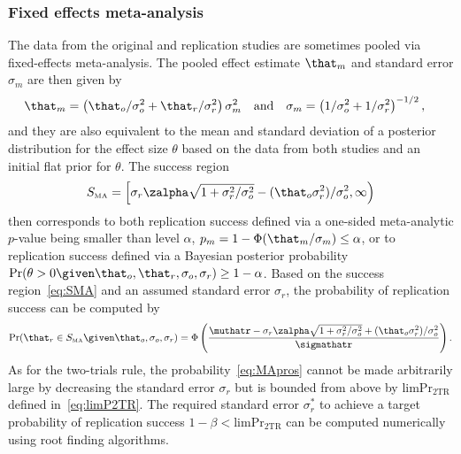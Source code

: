 \subsubsection{Fixed effects meta-analysis}
The data from the original and replication studies are sometimes pooled via
fixed-effects meta-analysis. The pooled effect estimate $\that_{m}$ and standard
error $\sigma_{m}$ are then given by
\begin{align*}
  &\that_{m} =
    \left(\that_{o}/\sigma_{o}^{2} + \that_{r}/\sigma^{2}_{r}\right)\sigma^{2}_{m}&
&\text{and}&                                                                                       &\sigma_{m} = \left(1/\sigma^{2}_{o} + 1/\sigma^{2}_{r}\right)^{-1/2},&
\end{align*}
and they are also equivalent to the mean and standard deviation of a posterior
distribution for the effect size $\theta$ based on the data from both studies
and an initial flat prior for $\theta$. The success
region %
\begin{align}
  \label{eq:SMA}
  S_{\scriptscriptstyle \text{MA}}
  = \left[\sigma_{r} \zalpha\sqrt{1 + \sigma^{2}_{r}/\sigma^{2}_{o}} -
  (\that_{o} \sigma^{2}_{r})/\sigma^{2}_{o},
  \infty \right)
\end{align}
then corresponds to both replication success defined via a one-sided
meta-analytic $p$-value being smaller than level $\alpha$, \ie{}
$p_{m} = 1 - \Phi(\that_{m}/\sigma_{m}) \leq \alpha$, or to replication success
defined via a Bayesian posterior probability
$\Pr(\theta > 0 \given \that_{o}, \that_{r}, \sigma_{o}, \sigma_{r}) \geq 1 - \alpha$.
Based on the success region~\eqref{eq:SMA} and an assumed standard error
$\sigma_{r}$, the probability of replication success can be computed by
\begin{align}
  \label{eq:MApros}
  \Pr(\that_{r} \in S_{\scriptscriptstyle \text{MA}} \given \that_{o}, \sigma_{o}, \sigma_{r})
  = %
  \Phi\left(\frac{\muthatr - \sigma_{r} \zalpha\sqrt{1 + \sigma^{2}_{r}/\sigma^{2}_{o}}
  + (\that_{o} \sigma^{2}_{r})/\sigma^{2}_{o}}{\sigmathatr}\right).
\end{align}
As for the two-trials rule, the probability~\eqref{eq:MApros} cannot be made
arbitrarily large by decreasing the standard error $\sigma_{r}$ but is bounded
from above by $\text{limPr}_{\text{2TR}}$ defined in~\eqref{eq:limP2TR}.
The required standard error $\sigma_{r}^{*}$ to achieve a target probability of
replication success $1 - \beta < \text{limPr}_{\text{2TR}}$ can be computed
numerically using root finding algorithms.


